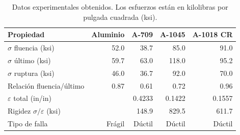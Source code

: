 \documentclass[11pt]{article}
\begin{document}
\begin{table}[htbp]
  \centering
  \caption{Datos experimentales obtenidos. Los esfuerzos están en kilolibras
           por pulgada cuadrada (ksi).}
  \label{tab:interpretacion}
  \begin{tabular}{lrrrr}
    \toprule
    \textbf{Propiedad} & \textbf{Aluminio} & \textbf{A-709} & \textbf{A-1045} & \textbf{A-1018 CR} \\
    \midrule
    $\sigma$ fluencia (ksi)     & 52.0   & 38.7   & 85.0    & 91.0 \\
    $\sigma$ último (ksi)       & 59.7   & 63.0   & 118.0   & 95.2 \\
    $\sigma$ ruptura (ksi)      & 46.0   & 36.7   & 92.0    & 70.0 \\
    Relación fluencia/último    & 0.87   & 0.61   & 0.72    & 0.96 \\
    $\varepsilon$ total (in/in) &        & 0.4233 & 0.1422  & 0.1557 \\
    Rigidez $\sigma/\varepsilon$ (ksi) &  & 148.9 & 829.5 & 611.7 \\
    Tipo de falla               & Frágil & Dúctil & Dúctil  & Dúctil \\
    \bottomrule
  \end{tabular}
\end{table}
\end{document}
